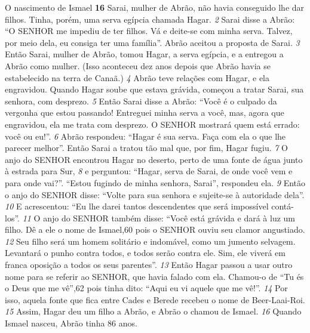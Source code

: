 \bigskip
O nascimento de Ismael
\textbf{\large 16}
 Sarai, mulher de Abrão, não havia conseguido lhe dar filhos. Tinha, porém,
uma serva egípcia chamada Hagar. 
\textit{\tiny 2}
Sarai disse a Abrão: “O SENHOR me impediu de
ter filhos. Vá e deite-se com minha serva. Talvez, por meio dela, eu consiga ter
uma família”. Abrão aceitou a proposta de Sarai. 
\textit{\tiny 3}
Então Sarai, mulher de Abrão,
tomou Hagar, a serva egípcia, e a entregou a Abrão como mulher. (Isso aconteceu
dez anos depois que Abrão havia se estabelecido na terra de Canaã.)
\textit{\tiny 4}
Abrão teve relações com Hagar, e ela engravidou. Quando Hagar soube que
estava grávida, começou a tratar Sarai, sua senhora, com desprezo. 
\textit{\tiny 5}
Então Sarai
disse a Abrão: “Você é o culpado da vergonha que estou passando! Entreguei
minha serva a você, mas, agora que engravidou, ela me trata com desprezo. O
SENHOR mostrará quem está errado: você ou eu!”.
\textit{\tiny 6}
Abrão respondeu: “Hagar é sua serva. Faça com ela o que lhe parecer melhor”.
Então Sarai a tratou tão mal que, por fim, Hagar fugiu.
\textit{\tiny 7}
O anjo do SENHOR encontrou Hagar no deserto, perto de uma fonte de água
junto à estrada para Sur, 
\textit{\tiny 8}
e perguntou: “Hagar, serva de Sarai, de onde você vem e
para onde vai?”.
   “Estou fugindo de minha senhora, Sarai”, respondeu ela.
\textit{\tiny 9}
Então o anjo do SENHOR disse: “Volte para sua senhora e sujeite-se à autoridade
dela”. 
\textit{\tiny 10}
E acrescentou: “Eu lhe darei tantos descendentes que será impossível contá-los”.
\textit{\tiny 11}
O anjo do SENHOR também disse: “Você está grávida e dará à luz um filho. Dê
a ele o nome de Ismael,60 pois o SENHOR ouviu seu clamor angustiado. 
\textit{\tiny 12}
Seu filho
será um homem solitário e indomável, como um jumento selvagem. Levantará o
punho contra todos, e todos serão contra ele. Sim, ele viverá em franca oposição a
todos os seus parentes”.   
\textit{\tiny 13}
Então Hagar passou a usar outro nome para se referir ao SENHOR, que havia
falado com ela. Chamou-o de “Tu és o Deus que me vê”,62 pois tinha dito: “Aqui eu
vi aquele que me vê!”. 
\textit{\tiny 14}
Por isso, aquela fonte que fica entre Cades e Berede
recebeu o nome de Beer-Laai-Roi.   
\textit{\tiny 15}
Assim, Hagar deu um filho a Abrão, e Abrão o chamou de Ismael. 
\textit{\tiny 16}
Quando
Ismael nasceu, Abrão tinha 86 anos.

